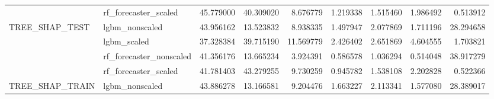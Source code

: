 \begin{table}
\begin{tabular}{llrrrrrrr}
 & rf\_forecaster\_scaled & {\cellcolor[HTML]{B40426}} \color[HTML]{F1F1F1} 45.779000 & {\cellcolor[HTML]{DC5D4A}} \color[HTML]{F1F1F1} 40.309020 & {\cellcolor[HTML]{7597F6}} \color[HTML]{F1F1F1} 8.676779 & {\cellcolor[HTML]{3E51C5}} \color[HTML]{F1F1F1} 1.219338 & {\cellcolor[HTML]{4055C8}} \color[HTML]{F1F1F1} 1.515460 & {\cellcolor[HTML]{445ACC}} \color[HTML]{F1F1F1} 1.986492 & {\cellcolor[HTML]{3B4CC0}} \color[HTML]{F1F1F1} 0.513912 \\
\cline{1-9}
\multirow[c]{4}{*}{TREE\_SHAP\_TEST} & lgbm\_nonscaled & {\cellcolor[HTML]{B40426}} \color[HTML]{F1F1F1} 43.956162 & {\cellcolor[HTML]{98B9FF}} \color[HTML]{000000} 13.523832 & {\cellcolor[HTML]{7295F4}} \color[HTML]{F1F1F1} 8.938335 & {\cellcolor[HTML]{3B4CC0}} \color[HTML]{F1F1F1} 1.497947 & {\cellcolor[HTML]{3E51C5}} \color[HTML]{F1F1F1} 2.077869 & {\cellcolor[HTML]{3C4EC2}} \color[HTML]{F1F1F1} 1.711196 & {\cellcolor[HTML]{F5C2AA}} \color[HTML]{000000} 28.294658 \\
 & lgbm\_scaled & {\cellcolor[HTML]{CB3E38}} \color[HTML]{F1F1F1} 37.328384 & {\cellcolor[HTML]{B40426}} \color[HTML]{F1F1F1} 39.715190 & {\cellcolor[HTML]{90B2FE}} \color[HTML]{000000} 11.569779 & {\cellcolor[HTML]{3F53C6}} \color[HTML]{F1F1F1} 2.426402 & {\cellcolor[HTML]{4257C9}} \color[HTML]{F1F1F1} 2.651869 & {\cellcolor[HTML]{516DDB}} \color[HTML]{F1F1F1} 4.604555 & {\cellcolor[HTML]{3B4CC0}} \color[HTML]{F1F1F1} 1.703821 \\
 & rf\_forecaster\_nonscaled & {\cellcolor[HTML]{B40426}} \color[HTML]{F1F1F1} 41.356176 & {\cellcolor[HTML]{A6C4FE}} \color[HTML]{000000} 13.665234 & {\cellcolor[HTML]{5470DE}} \color[HTML]{F1F1F1} 3.924391 & {\cellcolor[HTML]{3B4CC0}} \color[HTML]{F1F1F1} 0.586578 & {\cellcolor[HTML]{3E51C5}} \color[HTML]{F1F1F1} 1.036294 & {\cellcolor[HTML]{3B4CC0}} \color[HTML]{F1F1F1} 0.514048 & {\cellcolor[HTML]{CA3B37}} \color[HTML]{F1F1F1} 38.917279 \\
 & rf\_forecaster\_scaled & {\cellcolor[HTML]{C0282F}} \color[HTML]{F1F1F1} 41.781403 & {\cellcolor[HTML]{B40426}} \color[HTML]{F1F1F1} 43.279255 & {\cellcolor[HTML]{81A4FB}} \color[HTML]{F1F1F1} 9.730259 & {\cellcolor[HTML]{3D50C3}} \color[HTML]{F1F1F1} 0.945782 & {\cellcolor[HTML]{4257C9}} \color[HTML]{F1F1F1} 1.538108 & {\cellcolor[HTML]{465ECF}} \color[HTML]{F1F1F1} 2.202828 & {\cellcolor[HTML]{3B4CC0}} \color[HTML]{F1F1F1} 0.522366 \\
\cline{1-9}
\multirow[c]{4}{*}{TREE\_SHAP\_TRAIN} & lgbm\_nonscaled & {\cellcolor[HTML]{B40426}} \color[HTML]{F1F1F1} 43.886278 & {\cellcolor[HTML]{96B7FF}} \color[HTML]{000000} 13.166581 & {\cellcolor[HTML]{7597F6}} \color[HTML]{F1F1F1} 9.204476 & {\cellcolor[HTML]{3B4CC0}} \color[HTML]{F1F1F1} 1.663227 & {\cellcolor[HTML]{3E51C5}} \color[HTML]{F1F1F1} 2.113341 & {\cellcolor[HTML]{3B4CC0}} \color[HTML]{F1F1F1} 1.577080 & {\cellcolor[HTML]{F5C1A9}} \color[HTML]{000000} 28.389017 \\

\end{tabular}
\end{table}
